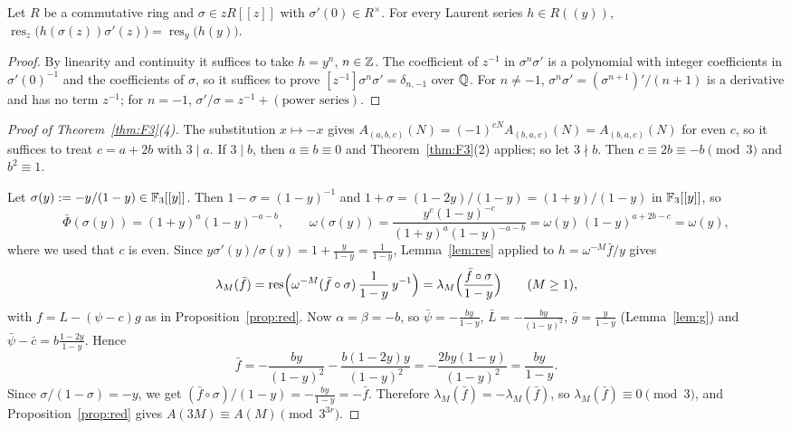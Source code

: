 \documentclass[11pt]{amsart}
\begin{document}
\begin{lemma}\label{lem:res}
Let $R$ be a commutative ring and $\sigma\in zR[[z]]$ with $\sigma'(0)\in R^\times$. For every Laurent series $h\in R((y))$, $\operatorname{res}_z\bigl(h(\sigma(z))\sigma'(z)\bigr)=\operatorname{res}_y\bigl(h(y)\bigr)$.
\end{lemma}
\begin{proof}
By linearity and continuity it suffices to take $h=y^n$, $n\in\mathbb{Z}$. The coefficient of $z^{-1}$ in $\sigma^n\sigma'$ is a polynomial with integer coefficients in $\sigma'(0)^{-1}$ and the coefficients of $\sigma$, so it suffices to prove $[z^{-1}]\sigma^n\sigma'=\delta_{n,-1}$ over $\mathbb{Q}$. For $n\ne-1$, $\sigma^n\sigma'=(\sigma^{n+1})'/(n+1)$ is a derivative and has no term $z^{-1}$; for $n=-1$, $\sigma'/\sigma=z^{-1}+(\text{power series})$.
\end{proof}

\begin{proof}[Proof of Theorem~\ref{thm:F3}(4)]
The substitution $x\mapsto-x$ gives $A_{(a,b,c)}(N)=(-1)^{cN}A_{(b,a,c)}(N)=A_{(b,a,c)}(N)$ for even $c$, so it suffices to treat $c=a+2b$ with $3\mid a$. If $3\mid b$, then $a\equiv b\equiv0$ and Theorem~\ref{thm:F3}(2) applies; so let $3\nmid b$. Then $c\equiv2b\equiv-b\pmod3$ and $b^2\equiv1$.

Let $\sigma(y):=-y/(1-y)\in\mathbb{F}_3[[y]]$. Then $1-\sigma=(1-y)^{-1}$ and $1+\sigma=(1-2y)/(1-y)=(1+y)/(1-y)$ in $\mathbb{F}_3[[y]]$, so
\[ \bar\Phi(\sigma(y))=(1+y)^a(1-y)^{-a-b},\qquad \omega(\sigma(y))=\frac{y^c(1-y)^{-c}}{(1+y)^a(1-y)^{-a-b}}=\omega(y)\,(1-y)^{a+2b-c}=\omega(y), \]
where we used that $c$ is even. Since $y\sigma'(y)/\sigma(y)=1+\frac y{1-y}=\frac1{1-y}$, Lemma~\ref{lem:res} applied to $h=\omega^{-M}\bar f/y$ gives
\[ \lambda_M(\bar f)=\operatorname{res}\Bigl(\omega^{-M}(\bar f\circ\sigma)\,\frac{1}{1-y}\,y^{-1}\Bigr)=\lambda_M\Bigl(\frac{\bar f\circ\sigma}{1-y}\Bigr)\qquad(M\ge1), \]
with $f=L-(\psi-c)g$ as in Proposition~\ref{prop:red}. Now $\alpha=\beta=-b$, so $\bar\psi=-\frac{by}{1-y}$, $\bar L=-\frac{by}{(1-y)^2}$, $\bar g=\frac y{1-y}$ (Lemma~\ref{lem:g}) and $\bar\psi-\bar c=b\frac{1-2y}{1-y}$. Hence
\[ \bar f=-\frac{by}{(1-y)^2}-\frac{b(1-2y)y}{(1-y)^2}=-\frac{2by(1-y)}{(1-y)^2}=\frac{by}{1-y}. \]
Since $\sigma/(1-\sigma)=-y$, we get $(\bar f\circ\sigma)/(1-y)=-\frac{by}{1-y}=-\bar f$. Therefore $\lambda_M(\bar f)=-\lambda_M(\bar f)$, so $\lambda_M(\bar f)\equiv0\pmod3$, and Proposition~\ref{prop:red} gives $A(3M)\equiv A(M)\pmod{3^{3r}}$.
\end{proof}
\end{document}
